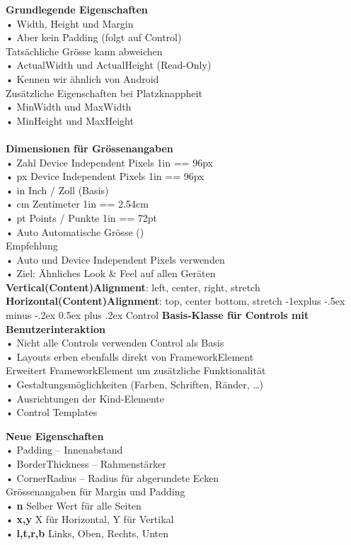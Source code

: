 \documentclass[10pt,landscape,a4paper]{article}
\makeatletter
\renewcommand{\subsection}{\@startsection{subsection}{2}{0mm}%
                                {-1explus -.5ex minus -.2ex}%
                                {0.5ex plus .2ex}%
                                {\normalfont\small\bfseries}}
\makeatother
\begin{document}
\begin{multicols*}{3}
\textbf{Grundlegende Eigenschaften}\\
• Width, Height und Margin\\
• Aber kein Padding (folgt auf Control)\\
Tatsächliche Grösse kann abweichen\\
• ActualWidth und ActualHeight (Read-Only)\\
• Kennen wir ähnlich von Android\\
Zusätzliche Eigenschaften bei Platzknappheit\\
• MinWidth und MaxWidth\\
• MinHeight und MaxHeight\\
\\
\textbf{Dimensionen für Grössenangaben}\\
• Zahl Device Independent Pixels 1in == 96px\\
• px Device Independent Pixels 1in == 96px\\
• in Inch / Zoll (Basis)\\
• cm Zentimeter 1in == 2.54cm\\
• pt Points / Punkte 1in == 72pt\\
• Auto Automatische Grösse ()\\
Empfehlung\\
• Auto und Device Independent Pixels verwenden\\
• Ziel: Ähnliches Look \& Feel auf allen Geräten\\

\textbf{Vertical(Content)Alignment}: left, center, right, stretch\\
\textbf{Horizontal(Content)Alignment}: top, center bottom, stretch
\subsection{Control}
\textbf{Basis-Klasse für Controls mit Benutzerinteraktion}\\
• Nicht alle Controls verwenden Control als Basis\\
• Layouts erben ebenfalls direkt von FrameworkElement\\
Erweitert FrameworkElement um zusätzliche Funktionalität\\
• Gestaltungsmöglichkeiten (Farben, Schriften, Ränder, …)\\
• Ausrichtungen der Kind-Elemente\\
• Control Templates

\textbf{Neue Eigenschaften}\\
• Padding – Innenabstand\\
• BorderThickness – Rahmenstärker\\
• CornerRadius – Radius für abgerundete Ecken\\
Grössenangaben für Margin und Padding\\
• \textbf{n} Selber Wert für alle Seiten\\
• \textbf{x,y} X für Horizontal, Y für Vertikal\\
• \textbf{l,t,r,b} Links, Oben, Rechts, Unten


\end{multicols*}
\end{document}
